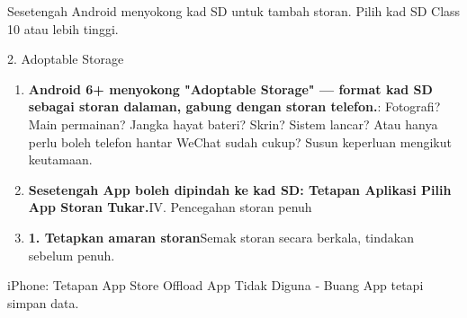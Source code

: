 


Sesetengah Android menyokong kad SD untuk tambah storan. Pilih kad SD Class 10 atau lebih tinggi.

\begin{tcbinfo}{2. Adoptable Storage}
\begin{enumerate}
  \item \textbf{Android 6+ menyokong "Adoptable Storage" — format kad SD sebagai storan dalaman, gabung dengan storan telefon.}: Fotografi? Main permainan? Jangka hayat bateri? Skrin? Sistem lancar? Atau hanya perlu boleh telefon hantar WeChat sudah cukup? Susun keperluan mengikut keutamaan.
  \item \textbf{Sesetengah App boleh dipindah ke kad SD: Tetapan Aplikasi Pilih App Storan Tukar.}IV. Pencegahan storan penuh
  \item \textbf{1. Tetapkan amaran storan}Semak storan secara berkala, tindakan sebelum penuh.
\end{enumerate}

\end{tcbinfo}


iPhone: Tetapan App Store Offload App Tidak Diguna ‑ Buang App tetapi simpan data.

